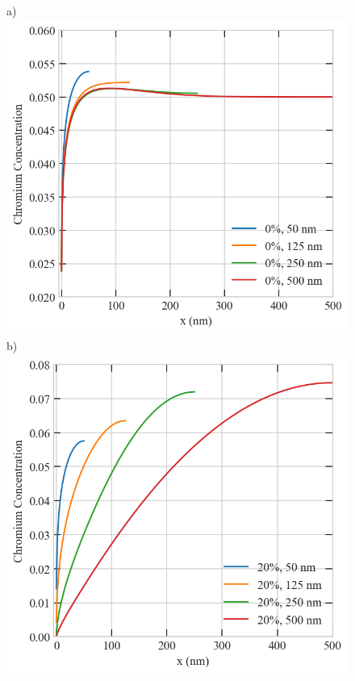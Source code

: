 \documentclass[utf8]{frontiersSCNS} %
\begin{document}
\clearpage  
    \begin{figure}[h!]  %
        \centering
        a)\includegraphics[scale=0.55]{srrt/plots/Fig14_a.png}
        b)\includegraphics[scale=0.55]{srrt/plots/Fig14_b.png}

\end{figure}
\end{document}

